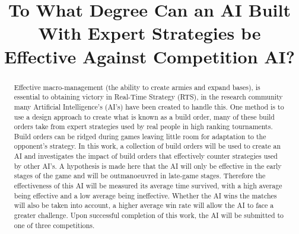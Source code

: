 \documentclass[journal]{IEEEtran}
\begin{document}
%
\title{%
	To What Degree Can an AI Built With Expert Strategies be Effective Against Competition AI?} %

%
%
\author{
}


\maketitle

\begin{abstract}
Effective macro-management (the ability to create armies and expand bases), is essential to obtaining victory in Real-Time Strategy (RTS), in the research community many Artificial Intelligence's (AI's) have been created to handle this. One method is to use a design approach to create what is known as a build order, many of these build orders take from expert strategies used by real people in high ranking tournaments. Build orders can be ridged during games leaving little room for adaptation to the opponent's strategy. In this work, a collection of build orders will be used to create an AI and investigates the impact of build orders that effectively counter strategies used by other AI's. A hypothesis is made here that the AI will only be effective in the early stages of the game and will be outmanoeuvred in late-game stages. Therefore the effectiveness of this AI will be measured its average time survived, with a high average being effective and a low average being ineffective. Whether the AI wins the matches will also be taken into account, a higher average win rate will allow the AI to face a greater challenge. Upon successful completion of this work, the AI will be submitted to one of three competitions.
\end{abstract}
\end{document}
